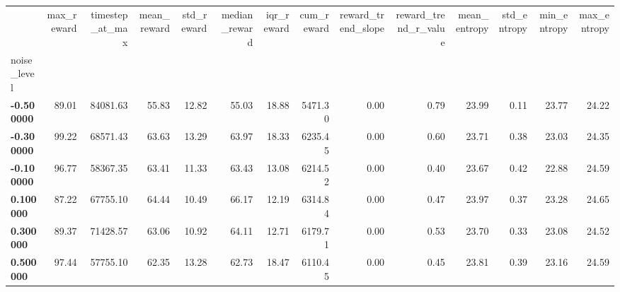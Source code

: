 \begin{tabular}{lrrrrrrrrrrrrr}
\toprule
 & max\_reward & timestep\_at\_max & mean\_reward & std\_reward & median\_reward & iqr\_reward & cum\_reward & reward\_trend\_slope & reward\_trend\_r\_value & mean\_entropy & std\_entropy & min\_entropy & max\_entropy \\
noise_level &  &  &  &  &  &  &  &  &  &  &  &  &  \\
\midrule
\textbf{-0.500000} & 89.01 & 84081.63 & 55.83 & 12.82 & 55.03 & 18.88 & 5471.30 & 0.00 & 0.79 & 23.99 & 0.11 & 23.77 & 24.22 \\
\textbf{-0.300000} & 99.22 & 68571.43 & 63.63 & 13.29 & 63.97 & 18.33 & 6235.45 & 0.00 & 0.60 & 23.71 & 0.38 & 23.03 & 24.35 \\
\textbf{-0.100000} & 96.77 & 58367.35 & 63.41 & 11.33 & 63.43 & 13.08 & 6214.52 & 0.00 & 0.40 & 23.67 & 0.42 & 22.88 & 24.59 \\
\textbf{0.100000} & 87.22 & 67755.10 & 64.44 & 10.49 & 66.17 & 12.19 & 6314.84 & 0.00 & 0.47 & 23.97 & 0.37 & 23.28 & 24.65 \\
\textbf{0.300000} & 89.37 & 71428.57 & 63.06 & 10.92 & 64.11 & 12.71 & 6179.71 & 0.00 & 0.53 & 23.70 & 0.33 & 23.08 & 24.52 \\
\textbf{0.500000} & 97.44 & 57755.10 & 62.35 & 13.28 & 62.73 & 18.47 & 6110.45 & 0.00 & 0.45 & 23.81 & 0.39 & 23.16 & 24.59 \\
\bottomrule
\end{tabular}
